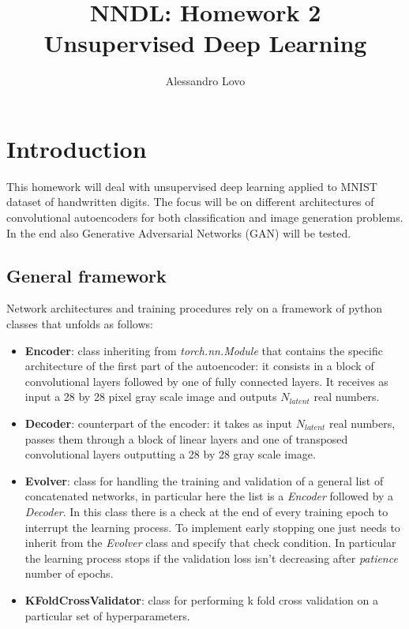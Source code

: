\documentclass[a4paper, 11pt]{article}
\begin{document}
\title{NNDL: Homework 2 \\ Unsupervised Deep Learning}
\author{Alessandro Lovo}
\maketitle

\section{Introduction}
  This homework will deal with unsupervised deep learning applied to MNIST dataset of handwritten digits. The focus will be on different architectures of convolutional autoencoders for both classification and image generation problems. In the end also Generative Adversarial Networks (GAN) will be tested.

  \subsection{General framework}
  Network architectures and training procedures rely on a framework of python classes that unfolds as follows:
  \begin{itemize}
    \item \textbf{Encoder}: class inheriting from \emph{torch.nn.Module} that contains the specific architecture of the first part of the autoencoder: it consists in a block of convolutional layers followed by one of fully connected layers. It receives as input a 28 by 28 pixel gray scale image and outputs $N_{latent}$ real numbers.
    \item \textbf{Decoder}: counterpart of the encoder: it takes as input $N_{latent}$ real numbers, passes them through a block of linear layers and one of transposed convolutional layers outputting a 28 by 28 gray scale image.
    \item \textbf{Evolver}: class for handling the training and validation of a general list of concatenated networks, in particular here the list is a \emph{Encoder} followed by a \emph{Decoder}. In this class there is a check at the end of every training epoch to interrupt the learning process. To implement early stopping one just needs to inherit from the \emph{Evolver} class and specify that check condition. In particular the learning process stops if the validation loss isn't decreasing after \emph{patience} number of epochs.
    \item \textbf{KFoldCrossValidator}: class for performing k fold cross validation on a particular set of hyperparameters.
  \end{itemize}
\end{document}
